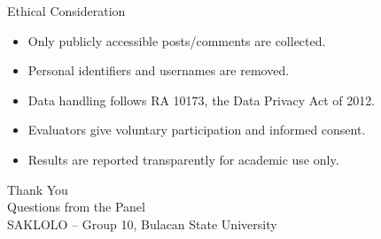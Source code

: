 \documentclass[aspectratio=169,10pt]{beamer}
\begin{document}
	
	\begin{frame}{Ethical Consideration}
		
		\begin{itemize}
			\item Only publicly accessible posts/comments are collected.
			\item Personal identifiers and usernames are removed.
			\item Data handling follows RA 10173, the Data Privacy Act of 2012.
			\item Evaluators give voluntary participation and informed consent.
			\item Results are reported transparently for academic use only.
		\end{itemize}
		
	\end{frame}
	
	
	\begin{frame}
		\centering
		
		{\Large Thank You}\\[3mm]
		
		{\large Questions from the Panel}\\[2mm]
		
		\small
		SAKLOLO -- Group 10, Bulacan State University
		
	\end{frame}
	
\end{document}
